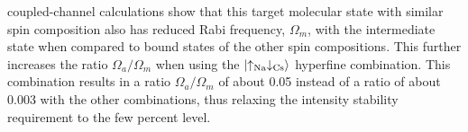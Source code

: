 \documentclass[aps,prl,twocolumn,10pt,superscriptaddress]{revtex4-1}
\newcommand{\Na}{\mathrm{Na}}
\newcommand{\Cs}{\mathrm{Cs}}
\begin{document}
coupled-channel calculations show that this target molecular state with similar spin composition also has reduced Rabi frequency, $ \Omega_m $,
with the intermediate state when compared to bound states of the other spin compositions. This further increases the ratio $\Omega_a/\Omega_m$ when using the $\ket{\uparrow_{\Na} \downarrow_{\Cs}}$ hyperfine combination.
This combination
results in a ratio $\Omega_a/\Omega_m$ of about 0.05 instead of a ratio of about 0.003
with the other combinations, thus relaxing the intensity stability requirement to the few percent level. %
\end{document}
